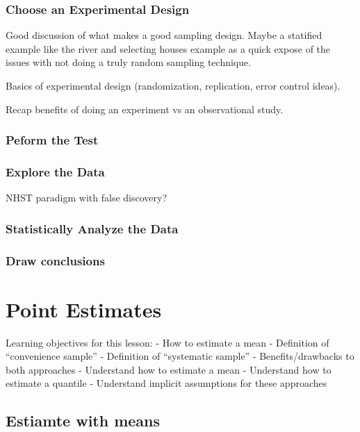\documentclass[]{book}
\begin{document}
\subsection{Choose an Experimental
Design}\label{choose-an-experimental-design-1}

Good discussion of what makes a good sampling design. Maybe a statified
example like the river and selecting houses example as a quick expose of
the issues with not doing a truly random sampling technique.

Basics of experimental design (randomization, replication, error control
ideas).

Recap benefits of doing an experiment vs an observational study.

\subsection{Peform the Test}\label{peform-the-test-1}

\subsection{Explore the Data}\label{explore-the-data}

NHST paradigm with false discovery?

\subsection{Statistically Analyze the
Data}\label{statistically-analyze-the-data-1}

\subsection{Draw conclusions}\label{draw-conclusions-1}

\chapter{Point Estimates}\label{point-estimates}

Learning objectives for this lesson: - How to estimate a mean -
Definition of ``convenience sample'' - Definition of ``systematic
sample'' - Benefits/drawbacks to both approaches - Understand how to
estimate a mean - Understand how to estimate a quantile - Understand
implicit assumptions for these approaches

\section{Estiamte with means}\label{estiamte-with-means}
\end{document}
